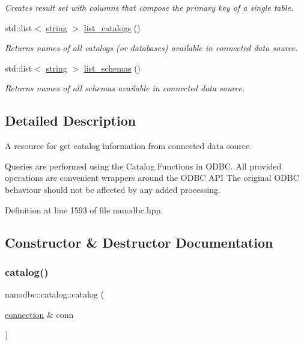 \begin{DoxyCompactItemize}
\begin{DoxyCompactList}\small\item\em Creates result set with columns that compose the primary key of a single table. \end{DoxyCompactList}\item 
std\+::list$<$ \mbox{\hyperlink{namespacenanodbc_abfc0ece56278e590911ec8352774c212}{string}} $>$ \mbox{\hyperlink{classnanodbc_1_1catalog_a47339f7d553a97b737f6529b53ee2b3d}{list\+\_\+catalogs}} ()
\begin{DoxyCompactList}\small\item\em Returns names of all catalogs (or databases) available in connected data source. \end{DoxyCompactList}\item 
std\+::list$<$ \mbox{\hyperlink{namespacenanodbc_abfc0ece56278e590911ec8352774c212}{string}} $>$ \mbox{\hyperlink{classnanodbc_1_1catalog_a00ec6b6cab5f6dab26dcd3b9d3435351}{list\+\_\+schemas}} ()
\begin{DoxyCompactList}\small\item\em Returns names of all schemas available in connected data source. \end{DoxyCompactList}\end{DoxyCompactItemize}


\subsection{Detailed Description}
A resource for get catalog information from connected data source. 

Queries are performed using the Catalog Functions in O\+D\+BC. All provided operations are convenient wrappers around the O\+D\+BC A\+PI The original O\+D\+BC behaviour should not be affected by any added processing. 

Definition at line 1593 of file nanodbc.\+hpp.



\subsection{Constructor \& Destructor Documentation}
\mbox{\label{classnanodbc_1_1catalog_ad18e6a0858639c14eb33b90736ab6d0e}} 
\subsubsection{\texorpdfstring{catalog()}{catalog()}}
{\footnotesize\ttfamily nanodbc\+::catalog\+::catalog (\begin{DoxyParamCaption}\item[{\mbox{\hyperlink{classnanodbc_1_1connection}{connection}} \&}]{conn }\end{DoxyParamCaption})\hspace{0.3cm}{\ttfamily [explicit]}}



